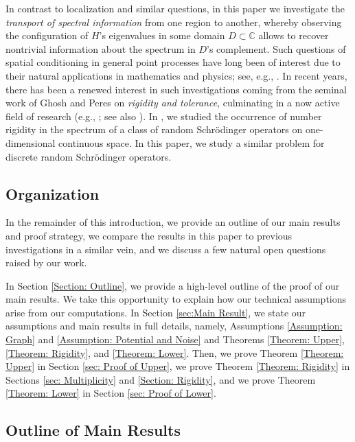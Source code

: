 \documentclass{amsart}
\numberwithin{equation}{section}
\theoremstyle{definition}
\newcommand\mbb{\mathbb}
\begin{document}
%

In contrast to localization and similar questions, in this paper we investigate the {\it transport
of spectral information} from one region to another,
whereby observing the configuration of $H$'s eigenvalues in some domain $D\subset\mbb C$
allows to recover nontrivial information about the spectrum in $D$'s complement.
Such questions of spatial conditioning in general point processes
have long been of interest due to their
natural applications in mathematics and physics; see, e.g., \cite{ApplicationsPtProcess,Ka17}.
In recent years, there has been a renewed interest in such investigations coming from
the seminal work of Ghosh and Peres \cite{GP17} on {\it rigidity and tolerance},
culminating in a now active field of research (e.g.,
\cite{Buf16,Buf18,BDQ18,BNQ18,G15,SG16,GhoshKrishnapur,Ghosh17,PeresSly};
see also \cite{AM80}).
In \cite{GGL20}, we studied the occurrence of number rigidity in the
spectrum of a class of random Schr\"odinger operators on one-dimensional continuous space.
In this paper, we study a similar problem for discrete random Schr\"odinger operators.

%


\subsection{Organization}
In the remainder of this introduction, we provide an outline of our main results
and proof strategy, we compare the results in this paper to previous investigations
in a similar vein, and we discuss a few natural open questions raised by our work.

In Section \ref{Section: Outline}, we provide a high-level
outline of the proof of our main results. We take this opportunity to
explain how our technical assumptions arise from our computations.
In Section \ref{sec:Main Result}, we state our assumptions
and main results in full details, namely,
Assumptions \ref{Assumption: Graph} and \ref{Assumption: Potential and Noise}
and Theorems \ref{Theorem: Upper}, \ref{Theorem: Rigidity}, and \ref{Theorem: Lower}.
Then, we prove Theorem \ref{Theorem: Upper} in Section \ref{sec: Proof of Upper},
we prove Theorem \ref{Theorem: Rigidity} in Sections \ref{sec: Multiplicity} and \ref{Section: Rigidity},
and we prove Theorem \ref{Theorem: Lower} in Section \ref{sec: Proof of Lower}.

% 

\subsection{Outline of Main Results}
\end{document}
